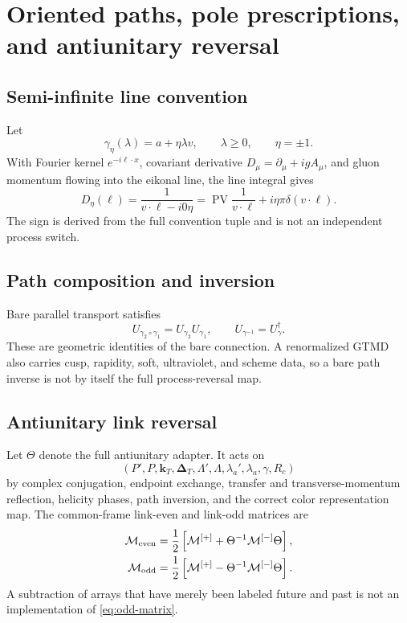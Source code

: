 \documentclass[11pt]{article}
\newcommand{\kT}{\bm{k}_{T}}
\newcommand{\DT}{\bm{\Delta}_{T}}
\newcommand{\cM}{\mathcal M}
\newcommand{\PV}{\operatorname{PV}}
\begin{document}
\section{Oriented paths, pole prescriptions, and antiunitary reversal}
\label{sec:paths}

\subsection{Semi-infinite line convention}

Let
\begin{equation}
 \gamma_\eta(\lambda)=a+\eta\lambda v,
 \qquad \lambda\geq0,
 \qquad \eta=\pm1.
 \label{eq:path-param}
\end{equation}
With Fourier kernel \(e^{-i\ell\cdot x}\), covariant derivative
\(D_\mu=\partial_\mu+igA_\mu\), and gluon momentum flowing into the eikonal
line, the line integral gives
\begin{equation}
 D_\eta(\ell)
 =\frac{1}{v\cdot\ell-i0\eta}
 =\PV\frac{1}{v\cdot\ell}
 +i\eta\pi\delta(v\cdot\ell).
 \label{eq:eikonal-pole}
\end{equation}
The sign is derived from the full convention tuple and is not an independent
process switch.

\subsection{Path composition and inversion}

Bare parallel transport satisfies
\begin{equation}
 U_{\gamma_2\circ\gamma_1}
 =U_{\gamma_2}U_{\gamma_1},
 \qquad
 U_{\gamma^{-1}}=U_\gamma^\dagger.
 \label{eq:path-laws}
\end{equation}
These are geometric identities of the bare connection.  A renormalized GTMD
also carries cusp, rapidity, soft, ultraviolet, and scheme data, so a bare
path inverse is not by itself the full process-reversal map.

\subsection{Antiunitary link reversal}

Let \(\Theta\) denote the full antiunitary adapter.  It acts on
\begin{equation}
 (P',P,\kT,\DT,\Lambda',\Lambda,
 \lambda_a',\lambda_a,\gamma,R_c)
\end{equation}
by complex conjugation, endpoint exchange, transfer and transverse-momentum
reflection, helicity phases, path inversion, and the correct color
representation map.  The common-frame link-even and link-odd matrices are
\begin{align}
 \cM_{\rm even}
 &=\frac12\left[
 \cM^{[+]}+\Theta^{-1}\cM^{[-]}\Theta
 \right],
 \label{eq:even-matrix}\\
 \cM_{\rm odd}
 &=\frac12\left[
 \cM^{[+]}-\Theta^{-1}\cM^{[-]}\Theta
 \right].
 \label{eq:odd-matrix}
\end{align}
A subtraction of arrays that have merely been labeled future and past is not
an implementation of \cref{eq:odd-matrix}.
\end{document}
